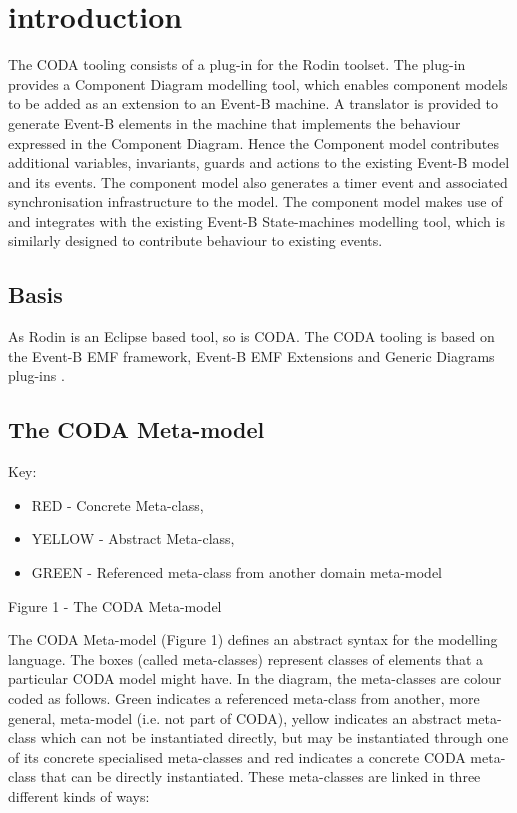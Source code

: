 \section{introduction}
\label{sec:component_diagrams-introduction}

The CODA tooling consists of a plug-in for the Rodin toolset. The plug-in provides a Component Diagram modelling tool, which enables component models to be added as an extension to an Event-B machine. A translator is provided to generate Event-B elements in the machine that implements the behaviour expressed in the Component Diagram. Hence the Component model contributes additional variables, invariants, guards and actions to the existing Event-B model and its events. The component model also generates a timer event and associated synchronisation infrastructure to the model. The component model makes use of and integrates with the existing Event-B State-machines  modelling tool, which is similarly designed to contribute behaviour to existing events.

\subsection{Basis}
As Rodin is an Eclipse based tool, so is CODA. The CODA tooling is based on the Event-B EMF framework, Event-B EMF Extensions and Generic Diagrams plug-ins .

\subsection{The CODA Meta-model}
Key:
\begin{itemize}
\item  RED - Concrete Meta-class,
\item  YELLOW - Abstract Meta-class,
\item  GREEN - Referenced meta-class from another domain meta-model
\end{itemize}


Figure 1 - The CODA Meta-model


The CODA Meta-model (Figure 1) defines an abstract syntax for the modelling language.
The boxes (called meta-classes) represent classes of elements that a particular CODA model might have.
In the diagram, the meta-classes are colour coded as follows.
Green indicates a referenced meta-class from another, more general, meta-model (i.e. not part of CODA), 
yellow indicates an abstract meta-class which can not be instantiated directly, but may be instantiated through one of its concrete specialised meta-classes and 
red indicates a concrete CODA meta-class that can be directly instantiated. 
These meta-classes are linked in three different kinds of ways:

